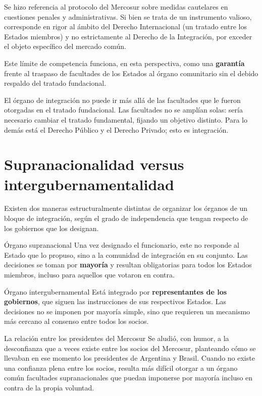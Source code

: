 \documentclass[12pt,oneside]{book}
\begin{document}
\begin{note}
Se hizo referencia al protocolo del Mercosur sobre medidas cautelares en cuestiones penales y administrativas. Si bien se trata de un instrumento valioso, corresponde en rigor al ámbito del Derecho Internacional (un tratado entre los Estados miembros) y no estrictamente al Derecho de la Integración, por exceder el objeto específico del mercado común.
\end{note}

Este límite de competencia funciona, en esta perspectiva, como una \textbf{garantía} frente al traspaso de facultades de los Estados al órgano comunitario sin el debido respaldo del tratado fundacional.

\begin{important}
El órgano de integración no puede ir más allá de las facultades que le fueron otorgadas en el tratado fundacional. Las facultades no se amplían solas: sería necesario cambiar el tratado fundamental, fijando un objetivo distinto. Para lo demás está el Derecho Público y el Derecho Privado; esto es integración.
\end{important}

\section{Supranacionalidad versus intergubernamentalidad}
\label{sec:supra}

Existen dos maneras estructuralmente distintas de organizar los órganos de un bloque de integración, según el grado de independencia que tengan respecto de los gobiernos que los designan.

\begin{definition}{Órgano supranacional}
Una vez designado el funcionario, este no responde al Estado que lo propuso, sino a la comunidad de integración en su conjunto. Las decisiones se toman por \textbf{mayoría} y resultan obligatorias para todos los Estados miembros, incluso para aquellos que votaron en contra.
\end{definition}

\begin{definition}{Órgano intergubernamental}
Está integrado por \textbf{representantes de los gobiernos}, que siguen las instrucciones de sus respectivos Estados. Las decisiones no se imponen por mayoría simple, sino que requieren un mecanismo más cercano al consenso entre todos los socios.
\end{definition}

\begin{example}{La relación entre los presidentes del Mercosur}
Se aludió, con humor, a la desconfianza que a veces existe entre los socios del Mercosur, planteando cómo se llevaban en ese momento los presidentes de Argentina y Brasil. Cuando no existe una confianza plena entre los socios, resulta más difícil otorgar a un órgano común facultades supranacionales que puedan imponerse por mayoría incluso en contra de la propia voluntad.
\end{example}
\end{document}

